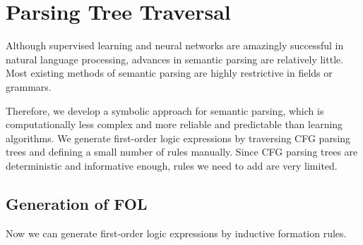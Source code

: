 \documentclass{article}
\begin{document}
\section{Parsing Tree Traversal}{



	Although supervised learning and neural networks are amazingly successful in natural language processing, advances in semantic parsing are relatively little. Most existing methods of semantic parsing are highly restrictive in fields or grammars. 


	Therefore, we develop a symbolic approach for semantic parsing, which is computationally less complex and more reliable and predictable than learning algorithms. We generate first-order logic expressions by traversing CFG parsing trees and defining a small number of rules manually. Since CFG parsing trees are deterministic and informative enough, rules we need to add are very limited. 

	\subsection{Generation of FOL}{




		Now we can generate first-order logic expressions by inductive formation rules. 

}}
\end{document}
